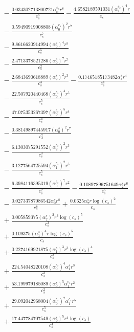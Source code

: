 \documentclass[10pt]{article}
\begin{document}
\begin{align*}
&{}  - \frac{0.034302713800721 \alpha_{0}^{c_s} r^{8}}{c_{s}^{8}} - \frac{4.6582189591031 \left(\alpha_{1}^{c_s}\right)^{4} r}{c_{s}} \\
&{}  - \frac{0.59490919008808 \left(\alpha_{0}^{c_s}\right)^{2} r^{7}}{c_{s}^{7}} \\
&{}  - \frac{9.8616620914994 \left(\alpha_{0}^s\right)^{4} r^{5}}{c_{s}^{5}} \\
&{}  - \frac{2.4713378521286 \left(\alpha_{0}^s\right)^{7} r^{2}}{c_{s}^{2}} \\
&{}  - \frac{2.6843690618889 \left(\alpha_{2}^s\right)^{2} r^{3}}{c_{s}^{3}} - \frac{0.17465185173482 \alpha_{4}^s r^{4}}{c_{s}^{4}} \\
&{}  - \frac{22.507920440468 \left(\alpha_{0}^{c_s}\right)^{4} r^{5}}{c_{s}^{5}} \\
&{}  - \frac{47.075353267397 \left(\alpha_{0}^{c_s}\right)^{5} r^{4}}{c_{s}^{4}} \\
&{}  - \frac{0.38149897445917 \left(\alpha_{0}^s\right)^{2} r^{7}}{c_{s}^{7}} \\
&{}  - \frac{6.1303075291552 \left(\alpha_{2}^{c_s}\right)^{2} r^{3}}{c_{s}^{3}} \\
&{}  - \frac{3.1277564725594 \left(\alpha_{1}^{c_s}\right)^{2} r^{5}}{c_{s}^{5}} \\
&{}  - \frac{6.3984116395319 \left(\alpha_{0}^{c_s}\right)^{7} r^{2}}{c_{s}^{2}} - \frac{0.10897896751649 \alpha_{2}^s r^{6}}{c_{s}^{6}} \\
&{}  - \frac{0.02733787086542 \alpha_{0}^s r^{8}}{c_{s}^{8}} + \frac{0.0625 \alpha_{7}^s r \log{\left(c_{s} \right)}^{2}}{c_{s}} \\
&{}  + \frac{0.005859375 \left(\alpha_{2}^s\right)^{2} r^{3} \log{\left(c_{s} \right)}^{5}}{c_{s}^{3}} \\
&{}  + \frac{0.109375 \left(\alpha_{1}^s\right)^{4} r \log{\left(c_{s} \right)}^{5}}{c_{s}} \\
&{}  + \frac{0.2274169921875 \left(\alpha_{1}^s\right)^{3} r^{3} \log{\left(c_{s} \right)}^{4}}{c_{s}^{3}} \\
&{}  + \frac{224.54048220108 \left(\alpha_{0}^{c_s}\right)^{4} \alpha_{1}^s r^{3}}{c_{s}^{3}} \\
&{}  + \frac{53.199979185089 \left(\alpha_{0}^s\right)^{5} \alpha_{1}^{c_s} r^{2}}{c_{s}^{2}} \\
&{}  + \frac{29.092042968004 \left(\alpha_{0}^{c_s}\right)^{2} \alpha_{1}^{c_s} r^{5}}{c_{s}^{5}} \\
&{}  + \frac{17.447784707549 \left(\alpha_{0}^s\right)^{5} r^{4} \log{\left(c_{s} \right)}}{c_{s}^{4}} \\

\end{align*}
\end{document}
